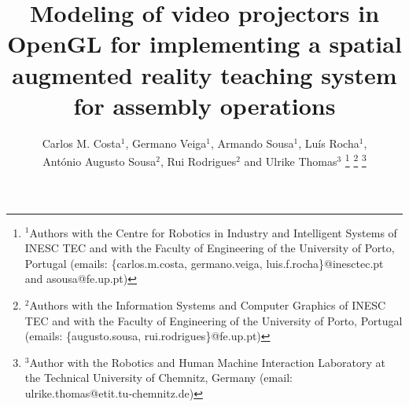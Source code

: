 









\title{\LARGE \bf
Modeling of video projectors in OpenGL for implementing a spatial augmented reality teaching system for assembly operations
}

\author{Carlos M. Costa$^{1}$, Germano Veiga$^{1}$, Armando Sousa$^{1}$, Luís Rocha$^{1}$,\\António Augusto Sousa$^{2}$, Rui Rodrigues$^{2}$ and Ulrike Thomas$^{3}$%
\thanks{$^{1}$Authors with the Centre for Robotics in Industry and Intelligent Systems of INESC TEC and with the Faculty of Engineering of the University of Porto, Portugal (emails: \{carlos.m.costa, germano.veiga, luis.f.rocha\}@inesctec.pt and asousa@fe.up.pt)}%
\thanks{$^{2}$Authors with the Information Systems and Computer Graphics of INESC TEC and with the Faculty of Engineering of the University of Porto, Portugal (emails: \{augusto.sousa, rui.rodrigues\}@fe.up.pt)}%
\thanks{$^{3}$Author with the Robotics and Human Machine Interaction Laboratory at the Technical University of Chemnitz, Germany (email: ulrike.thomas@etit.tu-chemnitz.de)}%
}


\maketitle



















